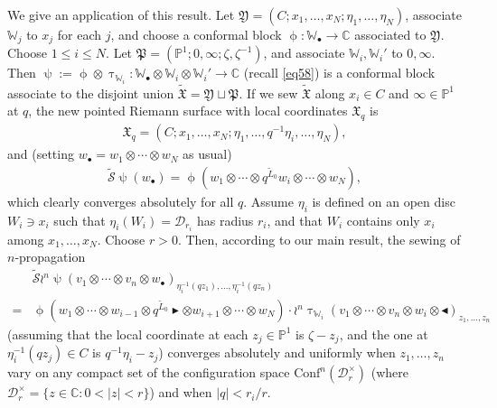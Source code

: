 \documentclass[12pt,a4paper,notitlepage]{article}
\theoremstyle{definition}
\theoremstyle{plain}
\newcommand{\fk}{\mathfrak}
\newcommand{\mc}{\mathcal}
\newcommand{\wtd}{\widetilde}
\newcommand{\Conf}{\mathrm{Conf}}
\newcommand{\blt}{\bullet}
\newcommand{\Wbb}{\mathbb W}
\newcommand{\Cbb}{\mathbb C}
\newcommand{\Pbb}{\mathbb P}
\newcommand{\btl}{\blacktriangleleft}
\newcommand{\btr}{\blacktriangleright}
\numberwithin{equation}{section}
\begin{document}
We give an application of this result. Let $\fk Y=(C;x_1,\dots,x_N;\eta_1,\dots,\eta_N)$, associate $\Wbb_j$ to $x_j$ for each $j$, and choose a conformal block $\upphi:\Wbb_\blt\rightarrow\Cbb$ associated to $\fk Y$. Choose $1\leq i\leq N$. Let $\fk P=(\Pbb^1;0,\infty;\zeta,\zeta^{-1})$, and associate $\Wbb_i,\Wbb_i'$ to $0,\infty$. Then $\uppsi:=\upphi\otimes\uptau_{\Wbb_i}:\Wbb_\blt\otimes\Wbb_i\otimes\Wbb_i'\rightarrow\Cbb$ (recall \eqref{eq58}) is a conformal block associate to the disjoint union $\wtd{\fk X}=\fk Y\sqcup\fk P$. If we sew $\wtd{\fk X}$ along $x_i\in C$ and $\infty\in\Pbb^1$ at $q$, the new pointed Riemann surface with local coordinates $\fk X_q$ is
\begin{align*}
\fk X_q=(C;x_1,\dots,x_N;\eta_1,\dots,q^{-1}\eta_i,\dots,\eta_N),	
\end{align*}
and  (setting $w_\blt=w_1\otimes\cdots\otimes w_N$ as usual)
\begin{align}
\wtd{\mc S}\uppsi(w_\blt)=\upphi(w_1\otimes\cdots\otimes q^{\wtd L_0}w_i\otimes\cdots\otimes w_N),\label{eq59}
\end{align}
which clearly converges absolutely for all $q$. Assume $\eta_i$ is defined on an open disc $W_i\ni x_i$ such that $\eta_i(W_i)=\mc D_{r_i}$ has radius $r_i$, and that $W_i$ contains only $x_i$ among $x_1,\dots,x_N$. Choose $r>0$. Then, according to our main result, the sewing of $n$-propagation
\begin{align*}
&\wtd{\mc S}\wr^n\uppsi	(v_1\otimes\cdots\otimes v_n\otimes w_\blt)_{\eta_i^{-1}(qz_1),\dots,\eta_i^{-1}(qz_n)}\\
=&\upphi(w_1\otimes\cdots\otimes w_{i-1} \otimes q^{\wtd L_0}\btr\otimes w_{i+1}\otimes\cdots\otimes w_N)\cdot\wr^n\uptau_{\Wbb_i}(v_1\otimes\cdots\otimes v_n\otimes w_i\otimes\btl)_{z_1,\dots,z_n}
\end{align*}
(assuming that the local coordinate at each $z_j\in\Pbb^1$ is $\zeta-z_j$, and the one at $\eta_i^{-1}(qz_j)\in C$ is $q^{-1}\eta_i-z_j$) converges absolutely and uniformly when $z_1,\dots,z_n$ vary on any compact set of the configuration space $\Conf^n(\mc D_r^\times)$ (where $\mc D_r^\times=\{z\in\Cbb:0<|z|<r\}$) and when $|q|<r_i/r$.
\end{document}
